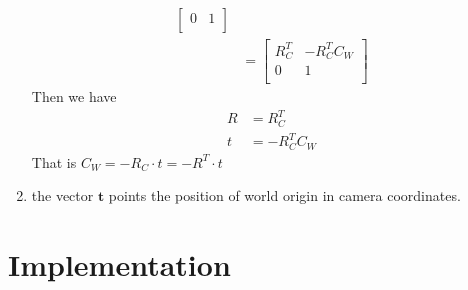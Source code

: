 \documentclass[a4paper, twoside, english]{article}
\begin{document}
\begin{enumerate}
\begin{equation*}
\begin{split}
\begin{bmatrix}
		0 & 1\\
	\end{bmatrix}\\
	& = \begin{bmatrix}
		R_C^T & -R_C^TC_W \\
		0 & 1\\
	\end{bmatrix}
	\end{split}
	\end{equation*}	
	Then we have 
	\begin{equation*}
		\begin{split}
			R &= R_C^T \\
			t &= -R_C^TC_W
		\end{split}
	\end{equation*}
	That is $ C_W = -R_C\cdot t = -R^T \cdot t $

	\item the vector $ \textbf{t} $ points the position of world origin in camera coordinates.
\end{enumerate}
\newpage

\part{Implementation}
\end{document}
